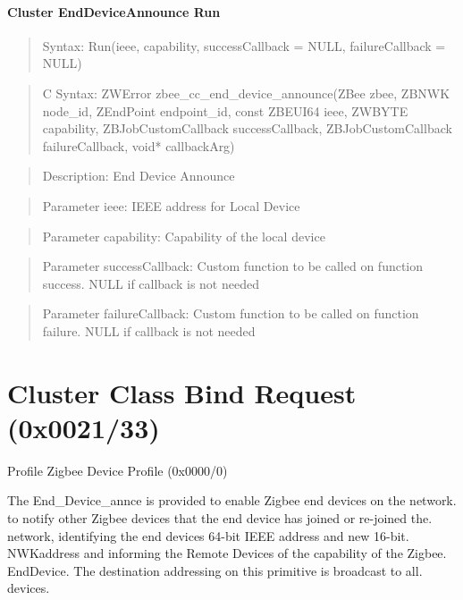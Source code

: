 \paragraph{Cluster EndDeviceAnnounce Run}
\begin{quote}Syntax: Run(ieee, capability, successCallback = NULL, failureCallback = NULL)\end{quote}
\begin{quote}C Syntax: ZWError zbee\_cc\_end\_device\_announce(ZBee zbee, ZBNWK node\_id, ZEndPoint endpoint\_id, const ZBEUI64 ieee, ZWBYTE capability, ZBJobCustomCallback successCallback, ZBJobCustomCallback failureCallback, void* callbackArg)\end{quote}
\begin{quote}Description: End Device Announce\end{quote}
\begin{quote}Parameter ieee: IEEE address for Local Device\end{quote}
\begin{quote}Parameter capability: Capability of the local device\end{quote}
\begin{quote}Parameter successCallback: Custom function to be called on function success. NULL if callback is not needed\end{quote}
\begin{quote}Parameter failureCallback: Custom function to be called on function failure. NULL if callback is not needed\end{quote}



\section{Cluster Class Bind Request (0x0021/33)}

Profile Zigbee Device Profile (0x0000/0)

The End\_Device\_annce is provided to enable Zigbee end devices on the network. to notify other Zigbee devices that the end device has joined or re-joined the. network, identifying the end devices 64-bit IEEE address and new 16-bit. NWKaddress and informing the Remote Devices of the capability of the Zigbee. EndDevice. The destination addressing on this primitive is broadcast to all. devices.

